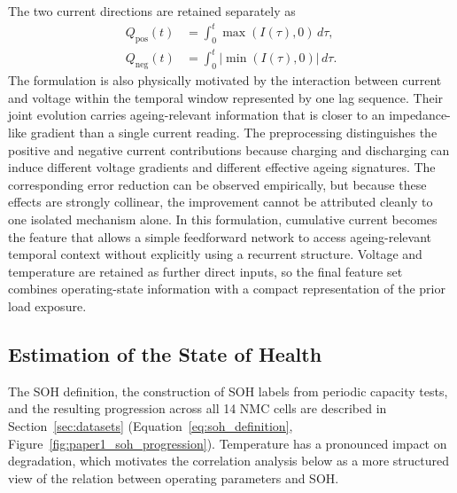 \documentclass[
    a4paper,
    12pt,
    titlepage,
    bibliography=totoc,
    twoside=on,
    parskip=false,
    numbers=noenddot,
    cleardoublepage=empty,
    DIV=12,
    BCOR=12.0mm,
    headheight=36pt,
    headings=openright
]{scrreprt}
\begin{document}
The two current directions are retained separately as
\begin{equation}
\begin{aligned}
Q_{\mathrm{pos}}(t) &= \int_{0}^{t} \max\!\left(I(\tau),0\right) \, d\tau ,\\
Q_{\mathrm{neg}}(t) &= \int_{0}^{t} \left\lvert \min\!\left(I(\tau),0\right) \right\rvert \, d\tau .
\end{aligned}
\end{equation}
The formulation is also physically motivated by the interaction between current and voltage within the temporal window represented by one lag sequence. Their joint evolution carries ageing-relevant information that is closer to an impedance-like gradient than a single current reading. The preprocessing distinguishes the positive and negative current contributions because charging and discharging can induce different voltage gradients and different effective ageing signatures. The corresponding error reduction can be observed empirically, but because these effects are strongly collinear, the improvement cannot be attributed cleanly to one isolated mechanism alone. In this formulation, cumulative current becomes the feature that allows a simple feedforward network to access ageing-relevant temporal context without explicitly using a recurrent structure. Voltage and temperature are retained as further direct inputs, so the final feature set combines operating-state information with a compact representation of the prior load exposure.

\subsection{Estimation of the State of Health}
The SOH definition, the construction of SOH labels from periodic capacity tests, and the resulting progression across all 14 NMC cells are described in Section~\ref{sec:datasets} (Equation~\ref{eq:soh_definition}, Figure~\ref{fig:paper1_soh_progression}). Temperature has a pronounced impact on degradation, which motivates the correlation analysis below as a more structured view of the relation between operating parameters and SOH.
\end{document}

